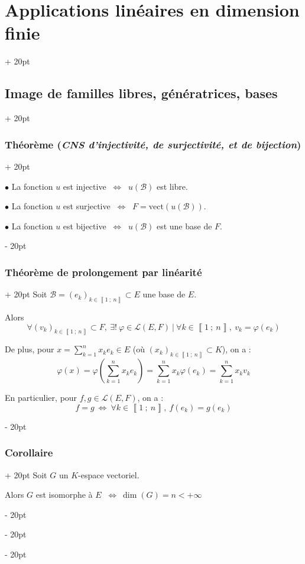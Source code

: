 \documentclass[a4paper, 12pt, twoside]{article}
\newcommand{\nset}[2]{\left\llbracket #1\ ;\ #2 \right\rrbracket}
\newcommand{\lr}[1]{\left( #1 \right)}
\newcommand{\ssi}{\ \Leftrightarrow \ }
\newcommand{\ind}[1][20pt]{\advance\leftskip + #1}
\newcommand{\deind}[1][20pt]{\advance\leftskip - #1}
\newenvironment{indt}[2][20pt]{#2 \par \ind[#1]}{\par \deind} %
\begin{document}
\begin{indt}{\section{Applications linéaires en dimension finie}}
\begin{indt}{\subsection{Image de familles libres, génératrices, bases}}
\begin{indt}{\subsubsection{Théorème (\textit{CNS d'injectivité, de surjectivité, et de bijection})}}
                \vspace{6pt}
                
                $\bullet$ La fonction $u$ est injective $\ssi$ $u(\mathcal B)$ est libre.

                $\bullet$ La fonction $u$ est surjective $\ssi$ $F = \mathrm{vect}(u(\mathcal B))$.

                $\bullet$ La fonction $u$ est bijective $\ssi$ $u(\mathcal B)$ est une base de $F$.
            \end{indt}

            \vspace{12pt}
            
            \begin{indt}{\subsubsection{Théorème de prolongement par linéarité}}
                Soit $\mathcal B = (e_k)_{k \in \nset 1 n} \subset E$ une base de $E$.

                Alors
                \[
                    \forall (v_k)_{k \in \nset 1 n} \subset F,\
                    \exists!\: \varphi \in \mathcal L(E, F)\ |\
                    \forall k \in \nset 1 n,\
                    v_k = \varphi(e_k)
                \]

                De plus, pour $\displaystyle x = \sum_{k = 1}^n x_k e_k \in E$ (où $(x_k)_{k \in \nset 1 n} \subset K$), on a :
                \[
                    \varphi(x)
                    = \varphi\!\lr{\sum_{k = 1}^n x_k e_k}
                    = \sum_{k = 1}^n x_k \varphi(e_k)
                    = \sum_{k = 1}^n x_k v_k
                \]

                En particulier, pour $f, g \in \mathcal L(E, F)$, on a :
                \[
                    f = g \ssi \forall k \in \nset 1 n,\ f(e_k) = g(e_k)
                \]
            \end{indt}

            \vspace{12pt}
            
            \begin{indt}{\subsubsection{Corollaire}}
                Soit $G$ un $K$-espace vectoriel.

                Alors $G$ est isomorphe à $E$ $\ssi \dim(G) = n < +\infty$
            \end{indt}
        \end{indt}


\end{indt}
\end{document}
